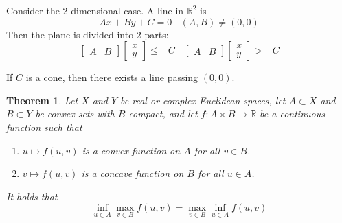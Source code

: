 \documentclass[aps,pra,onecolumn,notitlepage,superscriptaddress]{revtex4-1}
\newcommand{\R}{\mathbb{R}}
\newtheorem{theo}{Theorem}
\begin{document}
    Consider the 2-dimensional case. A line in $\R^2$ is
    \begin{equation}
        Ax+By+C = 0 \ \ \ \ (A,B) \neq (0,0)
    \end{equation}
    Then the plane is divided into 2 parts:
    \begin{equation*}
        \begin{bmatrix}
            A & B
        \end{bmatrix}
        \begin{bmatrix}
            x \\ y
        \end{bmatrix}
        \leq -C
        \ \ \ \ 
        \begin{bmatrix}
            A & B
        \end{bmatrix}
        \begin{bmatrix}
            x \\ y
        \end{bmatrix}
        > -C
    \end{equation*}

    If $C$ is a cone, then there exists a line passing $(0,0)$.

    \begin{theo}
        Let $X$ and $Y$ be real or complex Euclidean spaces, let $A \subset X$ and $B \subset Y$ be convex sets with $B$ compact, and let $f : A \times B \to \R$ be a continuous function such that
        \begin{enumerate}
            \item  $u \mapsto f(u,v)$ is a convex function on $A$ for all $v \in B$.
            \item  $v \mapsto f(u,v)$ is a concave function on $B$ for all $u \in A$.
        \end{enumerate}

        It holds that 
        \begin{equation}
            \inf_{u \in A} \max_{v \in B} f(u,v) = \max_{v \in B} \inf_{u \in A} f(u,v)
        \end{equation}
    \end{theo}
\end{document}
